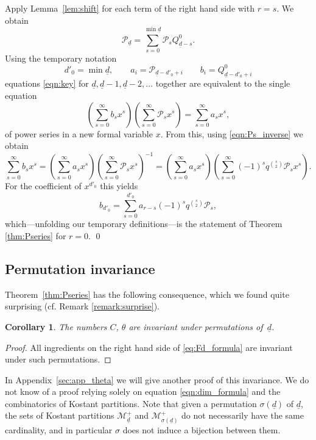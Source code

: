 \documentclass[a4paper]{amsart}
\newcommand{\CM}{\mathcal{M}}
\newcommand{\CP}{\mathcal{P}}
\newcommand{\ud}{\underline{d}}
\newtheorem{cor}[thm]{Corollary}
\theoremstyle{plain}
\begin{document}
Apply Lemma~\ref{lem:shift} for each term of the right hand side with $r=s$. We obtain
\begin{equation}\label{eqn:key}
\CP_{\ud}=\sum_{s=0}^{\min \ud}
\CP_s Q_{\ud-s}^{0}.
\end{equation}
Using the temporary notation
\[
d'_0=\min \ud,
\qquad
a_i=\CP_{\ud-d'_0+i}
\qquad
b_i=Q_{\ud-d'_0+i}^{0}
\]
equations \eqref{eqn:key} for $\ud, \ud-1, \ud-2, \ldots$ together are equivalent to the single equation
\[
\left(
\sum_{s=0}^\infty b_s x^s 
\right)
\left( 
\sum_{s=0}^\infty \CP_s x^s 
\right)
=
\sum_{s=0}^\infty a_s x^s,
\]
of power series in a new formal variable $x$. From this, using \eqref{eqn:Ps_inverse} we obtain
\[
\sum_{s=0}^\infty b_s x^s 
=
\left(
\sum_{s=0}^\infty a_s x^s 
\right)
\left( 
\sum_{s=0}^\infty \CP_s x^s 
\right)^{-1}=
\left(
\sum_{s=0}^\infty a_s x^s 
\right)
\left( 
\sum_{s=0}^\infty (-1)^s q^{\binom{s}{2}}\CP_s x^s 
\right).
\]
For the coefficient of $x^{d'_0}$ this yields
\[
b_{d'_0}=\sum_{s=0}^{d'_0} a_{r-s} (-1)^s q^{\binom{s}{2}} \CP_s,
\]
which---unfolding our temporary definitions---is the statement of Theorem \ref{thm:Pseries} for $r=0$.  \qed

\subsection{Permutation invariance} \label{sec:perm}

Theorem~\ref{thm:Pseries} has the following consequence, which we found quite surprising (cf. Remark \ref{remark:surprise}). 

\begin{cor} \label{cor:PermutationInvariance}
    The numbers $C$, $\theta$ are invariant under permutations of~$\ud$.
\end{cor}

\begin{proof}
    All ingredients on the right hand side of \eqref{eq:Fd_formula} are invariant under such permutations.
\end{proof}

In Appendix~\ref{sec:app_theta} we will give another proof of this invariance. We do not know of a proof relying solely on equation \eqref{eqn:dim_formula} and the combinatorics of Kostant partitions. Note that given a permutation $\sigma(\ud)$ of $\ud$, the sets of Kostant partitions $\CM^+_{\ud}$ and $\CM^+_{\sigma(\ud)}$ do not necessarily have the same cardinality, and in particular $\sigma$ does not induce a bijection between them.
\end{document}
